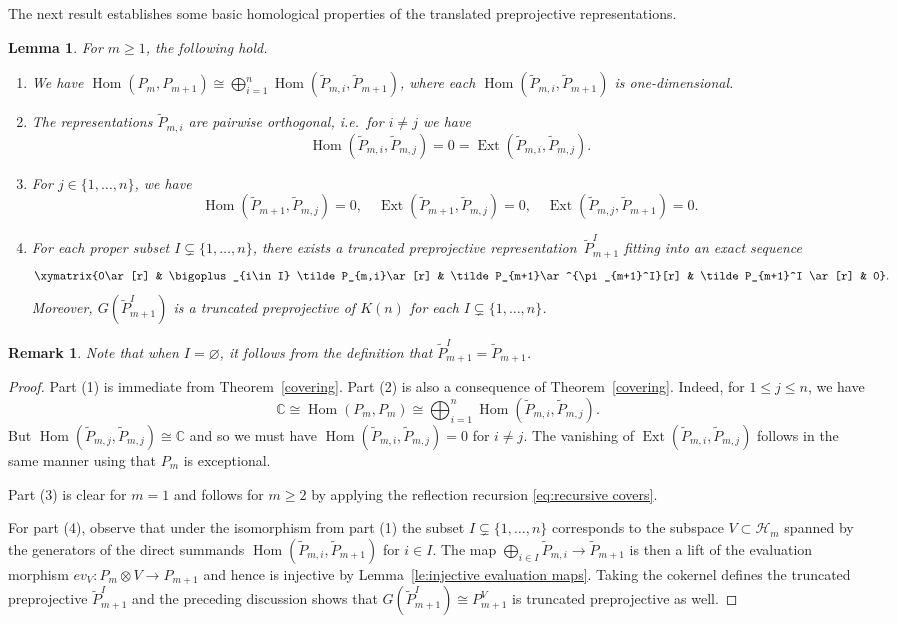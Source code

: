 \documentclass{amsart}
\newtheorem{lemma}[theorem]{Lemma}
\newtheorem{remark}[theorem]{Remark}
\numberwithin{equation}{section}
\newcommand{\CC}{\mathbb{C}}
\newcommand{\cH}{\mathcal{H}}
\newcommand{\Ext}{\operatorname{Ext}}
\newcommand{\Hom}{\operatorname{Hom}}
\newcommand{\sesm}[4]{\xymatrix{0\ar[r] & #1\ar[r] & #2\ar^{#4}[r] & #3 \ar[r] & 0}}
\begin{document}
The next result establishes some basic homological properties of the translated preprojective representations.
\begin{lemma}
  \label{le:homdecomposition}
  For $m\geq 1$, the following hold.
  \begin{enumerate}
    \item We have $\Hom(P_m,P_{m+1})\cong\bigoplus\limits_{i=1}^n \Hom(\tilde P_{m,i},\tilde P_{m+1})$, where each $\Hom(\tilde P_{m,i},\tilde P_{m+1})$ is one-dimensional.
    \item The representations $\tilde P_{m,i}$ are pairwise orthogonal, i.e.\ for $i\neq j$ we have 
      \[\Hom(\tilde P_{m,i},\tilde P_{m,j})=0=\Ext(\tilde P_{m,i},\tilde P_{m,j}).\]
    \item For $j\in\{1,\ldots,n\}$, we have
      \[\Hom(\tilde P_{m+1},\tilde P_{m,j})=0,\quad\Ext(\tilde P_{m+1},\tilde P_{m,j})=0,\quad\Ext(\tilde P_{m,j},\tilde P_{m+1})=0.\]
    \item For each proper subset $I\subsetneq\{1,\ldots,n\}$, there exists a truncated preprojective representation~$\tilde P_{m+1}^I$ fitting into an exact sequence 
      \begin{equation}
        \label{ses1}
        \sesm{\bigoplus_{i\in I} \tilde P_{m,i}}{\tilde P_{m+1}}{\tilde P_{m+1}^I}{\pi_{m+1}^I}.
      \end{equation}
      Moreover, $G(\tilde P_{m+1}^I)$ is a truncated preprojective of $K(n)$ for each $I\subsetneq\{1,\ldots,n\}$.
  \end{enumerate}
\end{lemma}
\begin{remark}
  Note that when $I=\varnothing$, it follows from the definition that $\tilde P_{m+1}^I=\tilde P_{m+1}$.
\end{remark}
\begin{proof}
  Part (1) is immediate from Theorem~\ref{covering}.
  Part (2) is also a consequence of Theorem~\ref{covering}.
  Indeed, for $1\leq j\leq n$, we have 
  $$\CC\cong\Hom(P_m,P_m)\cong\bigoplus_{i=1}^n \Hom(\tilde P_{m,i},\tilde P_{m,j}).$$
  But $\Hom(\tilde P_{m,j},\tilde P_{m,j})\cong\CC$ and so we must have $\Hom(\tilde P_{m,i},\tilde P_{m,j})=0$ for $i\neq j$.
  The vanishing of $\Ext(\tilde P_{m,i},\tilde P_{m,j})$ follows in the same manner using that $P_m$ is exceptional.

  Part (3) is clear for $m=1$ and follows for $m\ge2$ by applying the reflection recursion \eqref{eq:recursive covers}.

  For part (4), observe that under the isomorphism from part (1) the subset $I\subsetneq\{1,\ldots,n\}$ corresponds to the subspace $V\subset \cH_m$ spanned by the generators of the direct summands $\Hom(\tilde P_{m,i},\tilde P_{m+1})$ for $i\in I$.
  The map $\bigoplus_{i\in I} \tilde P_{m,i}\to\tilde P_{m+1}$ is then a lift of the evaluation morphism $ev_V:P_m\otimes V\to P_{m+1}$ and hence is injective by Lemma~\ref{le:injective evaluation maps}.
  Taking the cokernel defines the truncated preprojective $\tilde P_{m+1}^I$ and the preceding discussion shows that $G(\tilde P_{m+1}^I)\cong P_{m+1}^V$ is truncated preprojective as well.
\end{proof}
\end{document}
